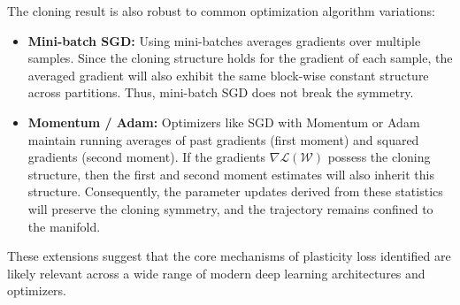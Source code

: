 \documentclass{article}
\newcommand{\Loss}{\mathcal{L}}
\begin{document}
The cloning result is also robust to common optimization algorithm variations:
\begin{itemize}
    \item \textbf{Mini-batch SGD:} Using mini-batches averages gradients over multiple samples. Since the cloning structure holds for the gradient of each sample, the averaged gradient will also exhibit the same block-wise constant structure across partitions. Thus, mini-batch SGD does not break the symmetry.
    \item \textbf{Momentum / Adam:} Optimizers like SGD with Momentum or Adam maintain running averages of past gradients (first moment) and squared gradients (second moment). If the gradients $\nabla\Loss(\mathcal{W})$ possess the cloning structure, then the first and second moment estimates will also inherit this structure. Consequently, the parameter updates derived from these statistics will preserve the cloning symmetry, and the trajectory remains confined to the manifold.
\end{itemize}
These extensions suggest that the core mechanisms of plasticity loss identified are likely relevant across a wide range of modern deep learning architectures and optimizers.
\end{document}
